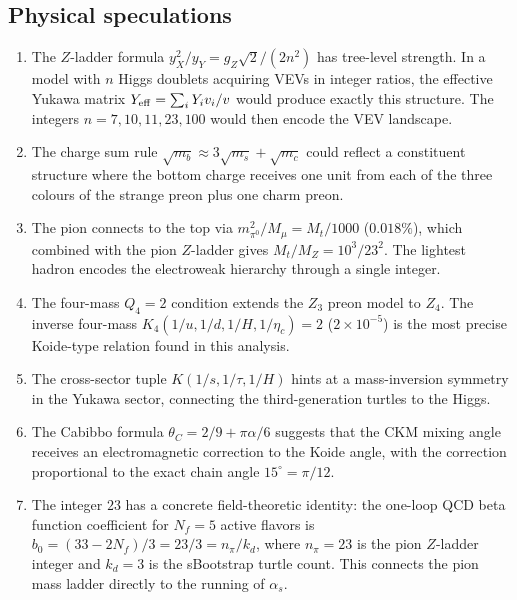 \documentclass[11pt]{article}
\begin{document}
\subsection{Physical speculations}

\begin{enumerate}
  \item The $Z$-ladder formula $y_X^2/y_Y = g_Z\sqrt{2}/(2n^2)$
    has tree-level strength.  In a model with $n$ Higgs doublets
    acquiring VEVs in integer ratios, the effective Yukawa matrix
    $Y_{\rm eff} = \sum_i Y_i v_i/v$ would produce exactly
    this structure.  The integers $n=7,10,11,23,100$ would then
    encode the VEV landscape.

  \item The charge sum rule $\sqrt{m_b}\approx 3\sqrt{m_s}+\sqrt{m_c}$
    could reflect a constituent structure where the bottom charge
    receives one unit from each of the three colours of the strange
    preon plus one charm preon.

  \item The pion connects to the top via $m_{\pi^0}^2/M_\mu = M_t/1000$
    ($0.018\%$), which combined with the pion $Z$-ladder gives
    $M_t/M_Z = 10^3/23^2$.  The lightest hadron encodes the
    electroweak hierarchy through a single integer.

  \item The four-mass $Q_4=2$ condition extends the $Z_3$ preon
    model to $Z_4$.  The inverse four-mass
    $K_4(1/u,1/d,1/H,1/\eta_c)=2$ ($2\times 10^{-5}$) is the
    most precise Koide-type relation found in this analysis.

  \item The cross-sector tuple $K(1/s,1/\tau,1/H)$ hints at
    a mass-inversion symmetry in the Yukawa sector,
    connecting the third-generation turtles to the Higgs.

  \item The Cabibbo formula $\theta_C = 2/9 + \pi\alpha/6$
    suggests that the CKM mixing angle receives an
    electromagnetic correction to the Koide angle, with the
    correction proportional to the exact chain angle
    $15^\circ = \pi/12$.

  \item The integer $23$ has a concrete field-theoretic
    identity: the one-loop QCD beta function coefficient for
    $N_f = 5$ active flavors is
    $b_0 = (33-2N_f)/3 = 23/3 = n_\pi/k_d$,
    where $n_\pi = 23$ is the pion $Z$-ladder integer and
    $k_d = 3$ is the sBootstrap turtle count.  This connects
    the pion mass ladder directly to the running of $\alpha_s$.


\end{enumerate}
\end{document}

